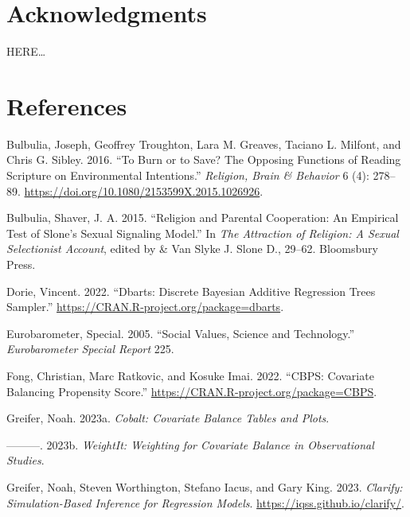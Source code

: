 \documentclass[
  singlecolumn]{report}
\newlength{\cslhangindent}
\newlength{\cslentryspacingunit} %
\newenvironment{CSLReferences}[2] %
 {%
  \setlength{\parindent}{0pt}
  \ifodd #1
  \let\oldpar\par
  \def\par{\hangindent=\cslhangindent\oldpar}
  \fi
  \setlength{\parskip}{#2\cslentryspacingunit}
 }%
 {}
\begin{document}
\hypertarget{acknowledgments}{%
\section{Acknowledgments}\label{acknowledgments}}

HERE\ldots{}

\hypertarget{references}{%
\section{References}\label{references}}

\hypertarget{refs}{}
\begin{CSLReferences}{1}{0}
\leavevmode{}%
Bulbulia, Joseph, Geoffrey Troughton, Lara M. Greaves, Taciano L.
Milfont, and Chris G. Sibley. 2016. {``To Burn or to Save? The Opposing
Functions of Reading Scripture on Environmental Intentions.''}
\emph{Religion, Brain \& Behavior} 6 (4): 278--89.
\url{https://doi.org/10.1080/2153599X.2015.1026926}.

\leavevmode{}%
Bulbulia, Shaver, J. A. 2015. {``Religion and Parental Cooperation: An
Empirical Test of Slone's Sexual Signaling Model.''} In \emph{The
Attraction of Religion: A Sexual Selectionist Account}, edited by \& Van
Slyke J. Slone D., 29--62. Bloomsbury Press.

\leavevmode{}%
Dorie, Vincent. 2022. {``Dbarts: Discrete Bayesian Additive Regression
Trees Sampler.''} \url{https://CRAN.R-project.org/package=dbarts}.

\leavevmode{}%
Eurobarometer, Special. 2005. {``Social Values, Science and
Technology.''} \emph{Eurobarometer Special Report} 225.

\leavevmode{}%
Fong, Christian, Marc Ratkovic, and Kosuke Imai. 2022. {``CBPS:
Covariate Balancing Propensity Score.''}
\url{https://CRAN.R-project.org/package=CBPS}.

\leavevmode{}%
Greifer, Noah. 2023a. \emph{Cobalt: Covariate Balance Tables and Plots}.

\leavevmode{}%
---------. 2023b. \emph{WeightIt: Weighting for Covariate Balance in
Observational Studies}.

\leavevmode{}%
Greifer, Noah, Steven Worthington, Stefano Iacus, and Gary King. 2023.
\emph{Clarify: Simulation-Based Inference for Regression Models}.
\url{https://iqss.github.io/clarify/}.


\end{CSLReferences}
\end{document}
